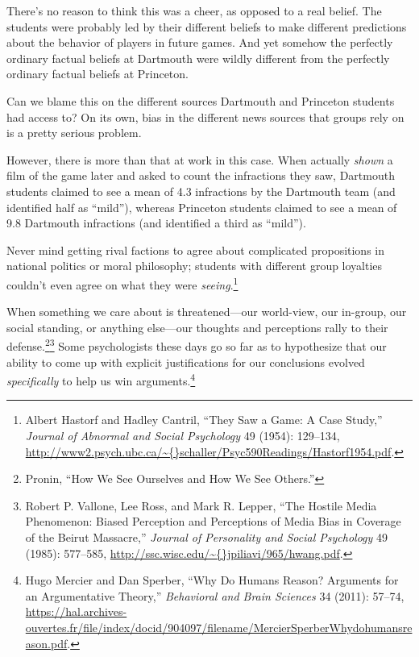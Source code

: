 {
 There's no reason to think this was a cheer, as
opposed to a real belief. The students were probably led by their
different beliefs to make different predictions about the behavior of
players in future games. And yet somehow the perfectly ordinary factual
beliefs at Dartmouth were wildly different from the perfectly ordinary
factual beliefs at Princeton.}

{
 Can we blame this on the different sources Dartmouth and Princeton
students had access to? On its own, bias in the different news sources
that groups rely on is a pretty serious problem.}

{
 However, there is more than that at work in this case. When
actually \textit{shown} a film of the game later and asked to count the
infractions they saw, Dartmouth students claimed to see a mean of 4.3
infractions by the Dartmouth team (and identified half as
``mild''), whereas Princeton
students claimed to see a mean of 9.8 Dartmouth infractions (and
identified a third as ``mild'').}

{
 Never mind getting rival factions to agree about complicated
propositions in national politics or moral philosophy; students with
different group loyalties couldn't even agree on what
they were \textit{seeing}.\footnote{Albert Hastorf and Hadley Cantril, ``They Saw
a Game: A Case Study,'' \textit{Journal of Abnormal
and Social Psychology} 49 (1954): 129--134,
\url{http://www2.psych.ubc.ca/\~{}schaller/Psyc590Readings/Hastorf1954.pdf}.}}

{
 When something we care about is threatened---our world-view, our
in-group, our social standing, or anything else---our thoughts and
perceptions rally to their defense.\footnote{Pronin, ``How We See Ourselves and How We See
Others.''}\supercomma\footnote{Robert P. Vallone, Lee Ross, and Mark R. Lepper,
``The Hostile Media Phenomenon: Biased Perception and
Perceptions of Media Bias in Coverage of the Beirut
Massacre,'' \textit{Journal of Personality and Social
Psychology} 49 (1985): 577--585,
\url{http://ssc.wisc.edu/\~{}jpiliavi/965/hwang.pdf}.} Some
psychologists these days go so far as to hypothesize that our ability
to come up with explicit justifications for our conclusions evolved
\textit{specifically} to help us win arguments.\footnote{Hugo Mercier and Dan Sperber, ``Why Do Humans
Reason? Arguments for an Argumentative Theory,''
\textit{Behavioral and Brain Sciences} 34 (2011): 57--74,
\url{https://hal.archives-ouvertes.fr/file/index/docid/904097/filename/MercierSperberWhydohumansreason.pdf}.}}

